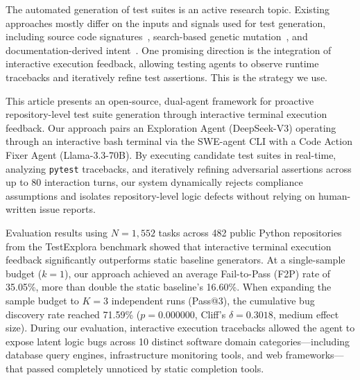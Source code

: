 The automated generation of test suites is an active research topic. Existing approaches mostly differ on the inputs and signals used for test generation, including source code signatures~\cite{bareiss2022code}, search-based genetic mutation~\cite{evosuite, randoop}, and documentation-derived intent~\cite{docprompting, testexplora}. One promising direction is the integration of interactive execution feedback, allowing testing agents to observe runtime tracebacks and iteratively refine test assertions. This is the strategy we use.

This article presents an open-source, dual-agent framework for proactive repository-level test suite generation through interactive terminal execution feedback. Our approach pairs an Exploration Agent (DeepSeek-V3) operating through an interactive bash terminal via the SWE-agent CLI with a Code Action Fixer Agent (Llama-3.3-70B). By executing candidate test suites in real-time, analyzing \texttt{pytest} tracebacks, and iteratively refining adversarial assertions across up to 80 interaction turns, our system dynamically rejects compliance assumptions and isolates repository-level logic defects without relying on human-written issue reports.

Evaluation results using $N=1,552$ tasks across 482 public Python repositories from the TestExplora benchmark showed that interactive terminal execution feedback significantly outperforms static baseline generators. At a single-sample budget ($k=1$), our approach achieved an average Fail-to-Pass (F2P) rate of 35.05\%, more than double the static baseline's 16.60\%. When expanding the sample budget to $K=3$ independent runs (Pass@3), the cumulative bug discovery rate reached 71.59\% ($p = 0.000000$, Cliff's $\delta = 0.3018$, medium effect size). During our evaluation, interactive execution tracebacks allowed the agent to expose latent logic bugs across 10 distinct software domain categories---including database query engines, infrastructure monitoring tools, and web frameworks---that passed completely unnoticed by static completion tools.

